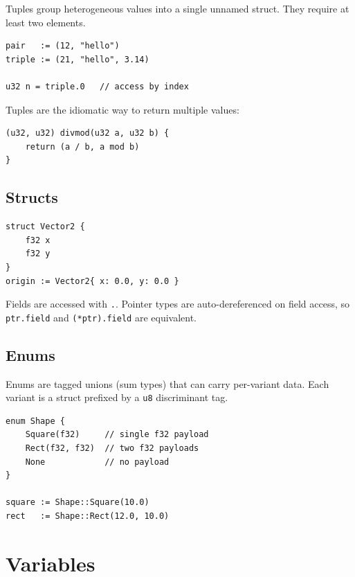 Tuples group heterogeneous values into a single unnamed struct.
They require at least two elements.

\begin{lstlisting}[style=zinc, caption={Tuple construction and access}]
pair   := (12, "hello")
triple := (21, "hello", 3.14)

u32 n = triple.0   // access by index
\end{lstlisting}

Tuples are the idiomatic way to return multiple values:

\begin{lstlisting}[style=zinc, caption={Multiple return values}]
(u32, u32) divmod(u32 a, u32 b) {
    return (a / b, a mod b)
}
\end{lstlisting}

\subsection{Structs}

\begin{lstlisting}[style=zinc, caption={Struct declaration and construction}]
struct Vector2 {
    f32 x
    f32 y
}
origin := Vector2{ x: 0.0, y: 0.0 }
\end{lstlisting}

Fields are accessed with \texttt{.}. Pointer types are auto-dereferenced on
field access, so \texttt{ptr.field} and \texttt{(*ptr).field} are equivalent.

\subsection{Enums}

Enums are tagged unions (sum types) that can carry per-variant data.
Each variant is a struct prefixed by a \texttt{u8} discriminant tag.

\begin{lstlisting}[style=zinc, caption={Enum declaration and construction}]
enum Shape {
    Square(f32)     // single f32 payload
    Rect(f32, f32)  // two f32 payloads
    None            // no payload
}

square := Shape::Square(10.0)
rect   := Shape::Rect(12.0, 10.0)
\end{lstlisting}

\section{Variables}

